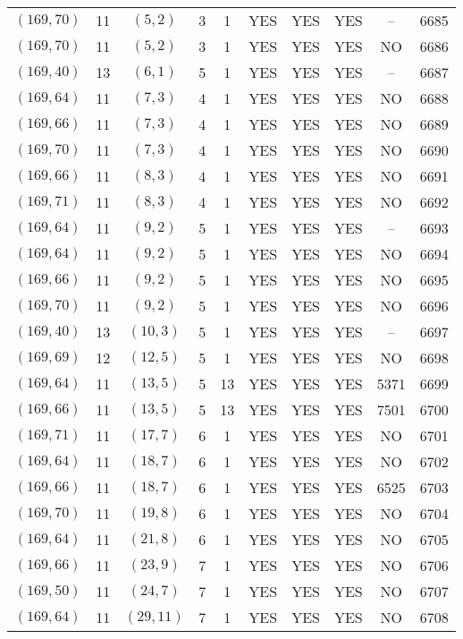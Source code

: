 \begin{longtable}{|c|c|c|c|c|c|c|c|c|c|}
$(169, 70)$ & 11 & $(5, 2)$ & 3 & 1 & YES & YES & YES & -- & 6685\\
$(169, 70)$ & 11 & $(5, 2)$ & 3 & 1 & YES & YES & YES & NO & 6686\\
$(169, 40)$ & 13 & $(6, 1)$ & 5 & 1 & YES & YES & YES & -- & 6687\\
$(169, 64)$ & 11 & $(7, 3)$ & 4 & 1 & YES & YES & YES & NO & 6688\\
$(169, 66)$ & 11 & $(7, 3)$ & 4 & 1 & YES & YES & YES & NO & 6689\\
$(169, 70)$ & 11 & $(7, 3)$ & 4 & 1 & YES & YES & YES & NO & 6690\\
$(169, 66)$ & 11 & $(8, 3)$ & 4 & 1 & YES & YES & YES & NO & 6691\\
$(169, 71)$ & 11 & $(8, 3)$ & 4 & 1 & YES & YES & YES & NO & 6692\\
$(169, 64)$ & 11 & $(9, 2)$ & 5 & 1 & YES & YES & YES & -- & 6693\\
$(169, 64)$ & 11 & $(9, 2)$ & 5 & 1 & YES & YES & YES & NO & 6694\\
$(169, 66)$ & 11 & $(9, 2)$ & 5 & 1 & YES & YES & YES & NO & 6695\\
$(169, 70)$ & 11 & $(9, 2)$ & 5 & 1 & YES & YES & YES & NO & 6696\\
$(169, 40)$ & 13 & $(10, 3)$ & 5 & 1 & YES & YES & YES & -- & 6697\\
$(169, 69)$ & 12 & $(12, 5)$ & 5 & 1 & YES & YES & YES & NO & 6698\\
$(169, 64)$ & 11 & $(13, 5)$ & 5 & 13 & YES & YES & YES & 5371 & 6699\\
$(169, 66)$ & 11 & $(13, 5)$ & 5 & 13 & YES & YES & YES & 7501 & 6700\\
$(169, 71)$ & 11 & $(17, 7)$ & 6 & 1 & YES & YES & YES & NO & 6701\\
$(169, 64)$ & 11 & $(18, 7)$ & 6 & 1 & YES & YES & YES & NO & 6702\\
$(169, 66)$ & 11 & $(18, 7)$ & 6 & 1 & YES & YES & YES & 6525 & 6703\\
$(169, 70)$ & 11 & $(19, 8)$ & 6 & 1 & YES & YES & YES & NO & 6704\\
$(169, 64)$ & 11 & $(21, 8)$ & 6 & 1 & YES & YES & YES & NO & 6705\\
$(169, 66)$ & 11 & $(23, 9)$ & 7 & 1 & YES & YES & YES & NO & 6706\\
$(169, 50)$ & 11 & $(24, 7)$ & 7 & 1 & YES & YES & YES & NO & 6707\\
$(169, 64)$ & 11 & $(29, 11)$ & 7 & 1 & YES & YES & YES & NO & 6708\\

\end{longtable}
